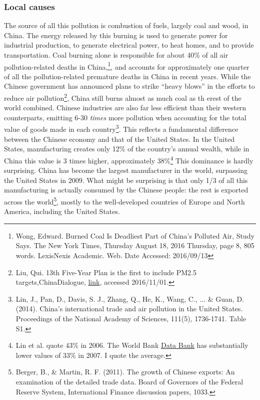 \subsubsection{Local causes}
The source of all this pollution is combustion of fuels, largely coal and wood, in China. The energy released by this burning is used to generate power for industrial production, to generate electrical power, to heat homes, and to provide transportation. Coal burning alone is responsible for about 40\% of all air pollution-related deaths in China,\footnote{Wong, Edward. Burned Coal Is Deadliest Part of China's Polluted Air, Study Says. The New York Times, Thursday August 18, 2016 Thursday, page 8, 805 words. LexisNexis Academic. Web. Date Accessed: 2016/09/13}, and accounts for approximately one quarter of all the pollution-related premature deaths in China in recent years. While the Chinese government has announced plans to strike ``heavy blows'' in the efforts to reduce air pollution\footnote{Liu, Qui. 13th Five-Year Plan is the first to include PM2.5 targets,ChinaDialogue, \href{https://www.chinadialogue.net/article/show/single/en/8696-13th-Five-Year-Plan-is-the-first-to-include-PM2-5-targets}{link}, accessed 2016/11/01.}, China still burns almost as much coal as th erest of the world combined. Chinese industries are also far less efficient than their western counterparts, emitting 6-30 \emph{times} more pollution when accounting for the total value of goods made in each country\footnote{Lin, J., Pan, D., Davis, S. J., Zhang, Q., He, K., Wang, C., ... \& Guan, D. (2014). China's international trade and air pollution in the United States. Proceedings of the National Academy of Sciences, 111(5), 1736-1741. Table S1.}. This reflects a fundamental difference between the Chinese economy and that of the United States. In the United States, manufacturing creates only 12\% of the country's annual wealth, while in China this value is 3 times higher, approximately 38\%\footnote{Lin et al. quote 43\% in 2006. The World Bank \href{http://databank.worldbank.org/data/reports.aspx?source=2&series=NV.IND.MANF.ZS&country=}{Data Bank} has substantially lower values of 33\% in 2007. I quote the average.} This dominance is hardly surprising. China has become the largest manufacturer in the world, surpassing the United States in 2009. What might be surprising is that only 1/3 of all this manufacturing is actually consumed by the Chinese people: the rest is exported across the world\footnote{Berger, B., \& Martin, R. F. (2011). The growth of Chinese exports: An examination of the detailed trade data. Board of Governors of the Federal Reserve System, International Finance discussion papers, 1033.}, mostly to the well-developed countries of Europe and North America, including the United States.


